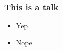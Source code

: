 \begin{frame}
\frametitle{This is a talk}
\begin{itemize}

\item Yep
\item Nope
\end{itemize}
\end{frame}